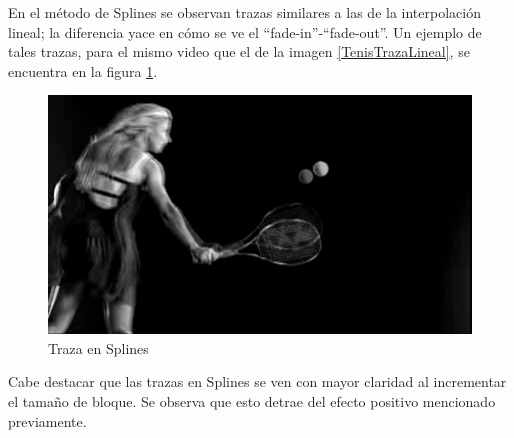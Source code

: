 \par En el m\'etodo de Splines se observan trazas similares a las de la interpolaci\'on lineal; la diferencia yace en c\'omo se ve el ``fade-in''-``fade-out''.
Un ejemplo de tales trazas, para el mismo video que el de la imagen \ref{TenisTrazaLineal}, se encuentra en la figura \ref{TenisTrazaSplines}.

\FloatBarrier
\begin{figure}[h]
\caption{Traza en Splines}
\label{TenisTrazaSplines}
\includegraphics[width=0.9\columnwidth]{imagenes/cualitativos/TTS.png}
\end{figure}
\FloatBarrier

\par Cabe destacar que las trazas en Splines se ven con mayor claridad al incrementar el tama\~no de bloque.
Se observa que esto detrae del efecto positivo mencionado previamente.

